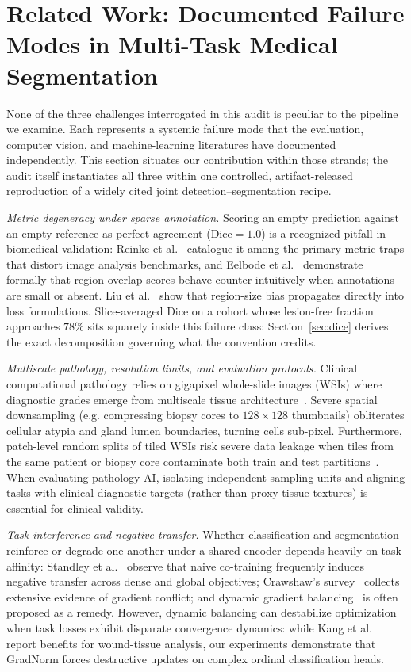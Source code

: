 \documentclass[preprint,12pt]{elsarticle}
\begin{document}
\section{Related Work: Documented Failure Modes in Multi-Task Medical Segmentation}
\label{sec:related}

None of the three challenges interrogated in this audit is peculiar to the pipeline we examine. Each represents a systemic failure mode that the evaluation, computer vision, and machine-learning literatures have documented independently. This section situates our contribution within those strands; the audit itself instantiates all three within one controlled, artifact-released reproduction of a widely cited joint detection--segmentation recipe.

\emph{Metric degeneracy under sparse annotation.} Scoring an empty prediction against an empty reference as perfect agreement ($\text{Dice} = 1.0$) is a recognized pitfall in biomedical validation: Reinke et al.~\cite{reinke2024metrics} catalogue it among the primary metric traps that distort image analysis benchmarks, and Eelbode et al.~\cite{eelbode2020optimization} demonstrate formally that region-overlap scores behave counter-intuitively when annotations are small or absent. Liu et al.~\cite{liu2024dice} show that region-size bias propagates directly into loss formulations. Slice-averaged Dice on a cohort whose lesion-free fraction approaches $78\%$ sits squarely inside this failure class: Section~\ref{sec:dice} derives the exact decomposition governing what the convention credits.

\emph{Multiscale pathology, resolution limits, and evaluation protocols.} Clinical computational pathology relies on gigapixel whole-slide images (WSIs) where diagnostic grades emerge from multiscale tissue architecture~\cite{campanella2019clinical,bulten2022artificial}. Severe spatial downsampling (e.g. compressing biopsy cores to $128 \times 128$ thumbnails) obliterates cellular atypia and gland lumen boundaries, turning cells sub-pixel. Furthermore, patch-level random splits of tiled WSIs risk severe data leakage when tiles from the same patient or biopsy core contaminate both train and test partitions~\cite{kapoor2023leakage,zech2018variable}. When evaluating pathology AI, isolating independent sampling units and aligning tasks with clinical diagnostic targets (rather than proxy tissue textures) is essential for clinical validity.

\emph{Task interference and negative transfer.} Whether classification and segmentation reinforce or degrade one another under a shared encoder depends heavily on task affinity: Standley et al.~\cite{standley2020tasks} observe that naive co-training frequently induces negative transfer across dense and global objectives; Crawshaw's survey~\cite{crawshaw2020survey} collects extensive evidence of gradient conflict; and dynamic gradient balancing~\cite{chen2018gradnorm} is often proposed as a remedy. However, dynamic balancing can destabilize optimization when task losses exhibit disparate convergence dynamics: while Kang et al.~\cite{kang2026gradnorm} report benefits for wound-tissue analysis, our experiments demonstrate that GradNorm forces destructive updates on complex ordinal classification heads.
\end{document}
